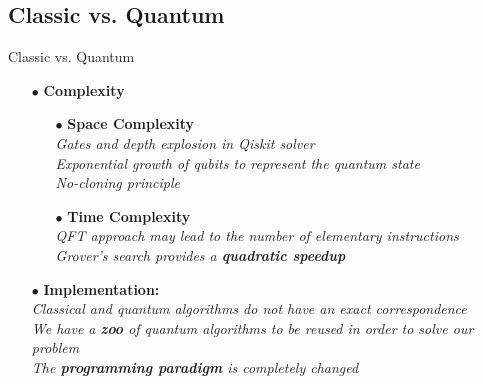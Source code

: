 	\subsection{Classic vs. Quantum}
		\begin{frame}{Classic vs. Quantum}
			\small
			\begin{itemize}
				\item[$\bullet$] \textbf{Complexity}
					\begin{itemize}
						\item[\tiny$\bullet$] \textbf{Space Complexity}\\
							\emph{Gates and depth explosion in Qiskit solver}\\
							\emph{Exponential growth of qubits to represent the quantum state}\\
							\emph{No-cloning principle} 
						
						\item[\tiny$\bullet$] \textbf{Time Complexity}\\
							\emph{QFT approach may lead to the number of elementary instructions}\\
							\emph{Grover's search provides a \textbf{quadratic speedup}}
					\end{itemize}
				
				\item[$\bullet$] \textbf{Implementation:} \\
					\emph{Classical and quantum algorithms do not have an exact correspondence}\\
					\emph{We have a \textbf{zoo} of quantum algorithms to be reused in order to solve our problem}\\
					\emph{The \textbf{programming paradigm} is completely changed}
			\end{itemize}
		\end{frame}
	
